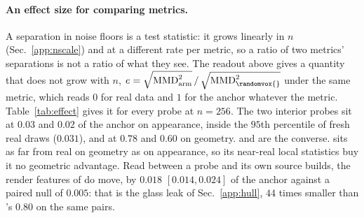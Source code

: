 

\paragraph{An effect size for comparing metrics.} A separation in noise floors is a test
statistic: it grows linearly in $n$ (Sec.~\ref{app:nscale}) and at a different rate per
metric, so a ratio of two metrics' separations is not a ratio of what they see. The readout
above gives a quantity that does not grow with $n$,
$e = \sqrt{\mathrm{MMD}^2_{\text{arm}}}\,/\,\sqrt{\mathrm{MMD}^2_{\randomvox{}}}$ under the
same metric, which reads $0$ for real data and $1$ for the anchor whatever the metric.
Table~\ref{tab:effect} gives it for every probe at $n{=}256$. The two interior probes sit at
$0.03$ and $0.02$ of the anchor on appearance, inside the $95$th percentile of fresh real
draws ($0.031$), and at $0.78$ and $0.60$ on geometry. \matshuffle{} and \monochrome{} are
the converse. \patchstitch{} sits as far from real on geometry as on appearance, so its
near-real local statistics buy it no geometric advantage. Read between a probe and its own
source builds, the render features of \solidify{} do move, by $0.018$ $[0.014, 0.024]$ of the
anchor against a paired null of $0.005$: that is the glass leak of Sec.~\ref{app:hull}, $44$
times smaller than \vkid{}'s $0.80$ on the same pairs.

